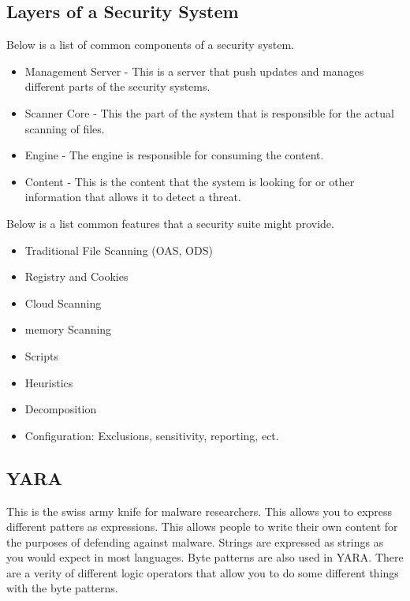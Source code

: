 \documentclass[letterpaper, onecolumn,10pt]{IEEEtran}
\begin{document}
            \subsection{Layers of a Security System}
            Below is a list of common components of a security system.
            \begin{itemize}
                \item Management Server - This is a server that push updates and manages different parts of the security systems.\\
                \item Scanner Core - This the part of the system that is responsible for the actual scanning of files.\\
                \item Engine - The engine is responsible for consuming the content.\\
                \item Content - This is the content that the system is looking for or other information that allows it to detect a threat.\\
            \end{itemize}
            
            Below is a list common features that a security suite might provide.
            \begin{itemize}
                \item Traditional File Scanning (OAS, ODS)\\
                \item Registry and Cookies\\
                \item Cloud Scanning\\
                \item memory Scanning\\
                \item Scripts\\
                \item Heuristics\\
                \item Decomposition\\
                \item Configuration: Exclusions, sensitivity, reporting, ect.\\
            \end{itemize}
            
            \subsection{YARA}
            This is the swiss army knife for malware researchers. This allows you to express different patters as expressions. This allows people to write their own content for the purposes of defending against malware. Strings are expressed as strings as you would expect in most languages. Byte patterns are also used in YARA. There are a verity of different logic operators that allow you to do some different things with the byte patterns.\\
            
\end{document}
